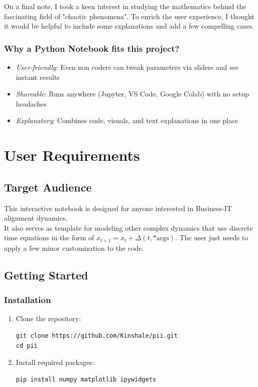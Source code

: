 \documentclass[a4paper, 10pt]{article}
\begin{document}
On a final note, I took a keen interest in studying the mathematics behind the fascinating field of "chaotic phenomena".
To enrich the user experience, I thought it would be helpful to include some explanations and add a few compelling cases.

\subsubsection*{Why a Python Notebook fits this project?}

\begin{itemize}
	\item \textit{User-friendly}: Even non coders can tweak parameters via sliders and see instant results
	\item \textit{Shareable}: Runs anywhere (Jupyter, VS Code, Google Colab) with no setup headaches
	\item \textit{Explanatory}: Combines code, visuals, and text explanations in one place
\end{itemize}

\section{User Requirements}
\subsection{Target Audience}
This interactive notebook is designed for anyone interested in Business-IT alignment dynamics. \\
It also serves as template for modeling other complex dynamics that use discrete time equations in the form of $x_{t+1} = x_t + \Delta(t, \text{*args})$. The user just needs to apply a few minor customization to the code.

\subsection{Getting Started}
\subsubsection{Installation}
\begin{enumerate}
	\item Clone the repository:
	      \begin{lstlisting}[style=bashstyle]
git clone https://github.com/Kinshale/pii.git
cd pii
    \end{lstlisting}

	\item Install required packages:
	      \begin{lstlisting}[style=bashstyle]
pip install numpy matplotlib ipywidgets
    \end{lstlisting}
\end{enumerate}
\end{document}
